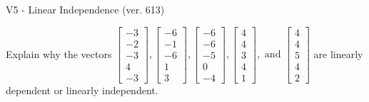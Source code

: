 \begin{exercise}
  \begin{exerciseTitle}V5 - Linear Independence (ver. 613)\end{exerciseTitle}
  \begin{exerciseStatement}
    Explain why the vectors \(\left[\begin{array}{r}
-3 \\
-2 \\
-3 \\
4 \\
-3
\end{array}\right] , \left[\begin{array}{r}
-6 \\
-1 \\
-6 \\
1 \\
3
\end{array}\right] , \left[\begin{array}{r}
-6 \\
-6 \\
-5 \\
0 \\
-4
\end{array}\right] , \left[\begin{array}{r}
4 \\
4 \\
3 \\
4 \\
1
\end{array}\right] , \text{ and } \left[\begin{array}{r}
4 \\
4 \\
5 \\
4 \\
2
\end{array}\right]\) are linearly dependent or linearly independent.	



\end{exerciseStatement}
\end{exercise}
